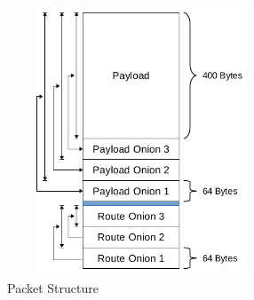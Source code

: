 \documentclass{article}
\begin{document}
\begin{figure}[h]
	\centering
  	\includegraphics[width=8cm,height=8cm,keepaspectratio]{img/BasicPacketStructure.png}
	\caption{Packet Structure}
\end{figure}

\newpage
\end{document}
